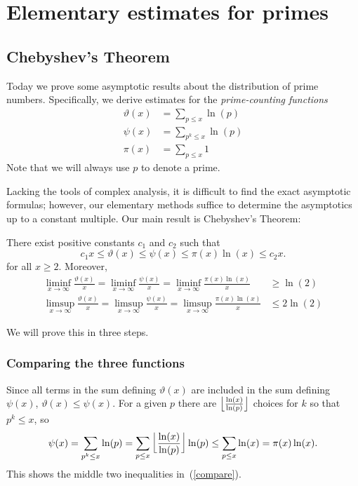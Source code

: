 \chapter{Elementary estimates for primes}
\section{Chebyshev's Theorem}
Today we prove some asymptotic results about the distribution of prime numbers. Specifically, we derive estimates for the {\it prime-counting functions}
\begin{align*}
\vartheta(x)&=\sum_{p\leq x}\ln(p)\\
\psi(x)&=\sum_{p^k\leq x}\ln(p)\\%
\pi(x)&=\sum_{p\leq x} 1
\end{align*}
Note that we will always use $p$ to denote a prime.

Lacking the tools of complex analysis, it is difficult to find the exact asymptotic formulas; however, our elementary methods suffice to determine the asymptotics up to a constant multiple. Our main result is Chebyshev's Theorem:
\begin{thm}\cite[Theorem 6.3]{nath}
\label{cheb}
There exist positive constants $c_1$ and $c_2$ such that
\begin{equation}\label{compare}
c_1x\leq \vartheta(x)\leq \psi(x)\leq \pi(x)\ln(x)\leq c_2 x.
\end{equation}
for all $x\geq 2$. Moreover,
\begin{align}
\liminf_{x\to\infty}\frac{\vartheta(x)}{x}= \liminf_{x\to \infty} \frac{\psi(x)}{x}= \liminf_{x\to \infty}\frac{\pi(x)\ln(x)}{x}&\geq \ln(2)\label{inf}\\
\limsup_{x\to\infty}\frac{\vartheta(x)}{x}= \limsup_{x\to \infty} \frac{\psi(x)}{x}=  \limsup_{x\to \infty}\frac{\pi(x)\ln(x)}{x}&\leq 2\ln(2) \label{sup}
\end{align}
\end{thm}
We will prove this in three steps.
\subsection{Comparing the three functions}
Since all terms in the sum defining $\vartheta(x)$ are included in the sum defining $\psi(x)$, $\vartheta(x)\leq \psi(x)$. %
For a given $p$ there are $\left\lfloor {\frac{\ln(x)}{\ln(p)}}\right\rfloor$ choices for $k$ so that $p^k\leq x$, so
\[\psi(x)=\sum_{p^k\leq x} \ln(p)=\sum_{p\leq x} \left\lfloor {\frac{\ln(x)}{\ln(p)}}\right\rfloor\ln(p)\leq \sum_{p\leq x} \ln(x)=\pi(x)\ln(x).\]
This shows the middle two inequalities in~(\ref{compare}).

